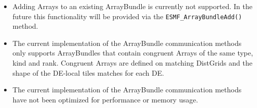 
\begin{itemize}
\item Adding Arrays to an existing ArrayBundle is currently not supported. In
the future this functionality will be provided via the
{\tt ESMF\_ArrayBundleAdd()} method.
\item The current implementation of the ArrayBundle communication methods only
supports ArrayBundles that contain congruent Arrays of the same type, kind and
rank. Congruent Arrays are defined on matching DistGrids and the shape of the
DE-local tiles matches for each DE.
\item The current implementation of the ArrayBundle communication methods have
not been optimized for performance or memory usage.
\end{itemize}
